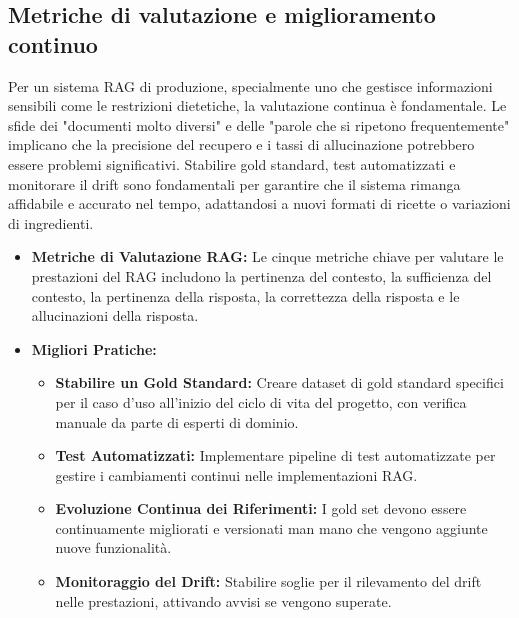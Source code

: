 \documentclass[a4paper, 11pt]{article}
\begin{document}
\subsection{Metriche di valutazione e miglioramento continuo}
Per un sistema RAG di produzione, specialmente uno che gestisce informazioni sensibili come le restrizioni dietetiche, la valutazione continua è fondamentale. Le sfide dei "documenti molto diversi" e delle "parole che si ripetono frequentemente" implicano che la precisione del recupero e i tassi di allucinazione \cite{avoiding_hallucinations} potrebbero essere problemi significativi. Stabilire gold standard, test automatizzati e monitorare il drift \cite{rag_evaluation_metrics} sono fondamentali per garantire che il sistema rimanga affidabile e accurato nel tempo, adattandosi a nuovi formati di ricette o variazioni di ingredienti.
\begin{itemize}
    \item \textbf{Metriche di Valutazione RAG:} Le cinque metriche chiave per valutare le prestazioni del RAG includono la pertinenza del contesto, la sufficienza del contesto, la pertinenza della risposta, la correttezza della risposta e le allucinazioni della risposta. \cite{rag_evaluation_metrics}
    \item \textbf{Migliori Pratiche:}
    \begin{itemize}
        \item \textbf{Stabilire un Gold Standard:} Creare dataset di gold standard specifici per il caso d'uso all'inizio del ciclo di vita del progetto, con verifica manuale da parte di esperti di dominio. \cite{rag_evaluation_metrics}
        \item \textbf{Test Automatizzati:} Implementare pipeline di test automatizzate per gestire i cambiamenti continui nelle implementazioni RAG. \cite{rag_evaluation_metrics}
        \item \textbf{Evoluzione Continua dei Riferimenti:} I gold set devono essere continuamente migliorati e versionati man mano che vengono aggiunte nuove funzionalità. \cite{rag_evaluation_metrics}
        \item \textbf{Monitoraggio del Drift:} Stabilire soglie per il rilevamento del drift nelle prestazioni, attivando avvisi se vengono superate. \cite{rag_evaluation_metrics}
    \end{itemize}
\end{itemize}
\end{document}
